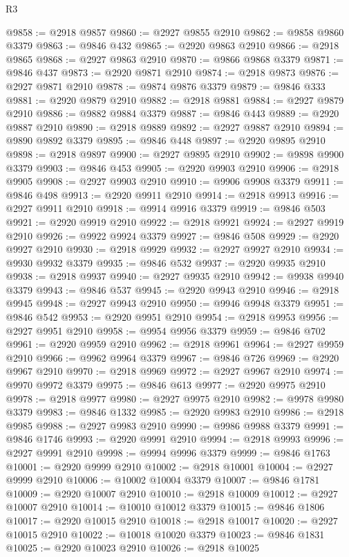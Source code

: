 \begin{lexlean}{R3}
\begin{coremodule}
@9858 := @2918 @9857
@9860 := @2927 @9855 @2910
@9862 := @9858 @9860 @3379
@9863 := @9846 @432
@9865 := @2920 @9863 @2910
@9866 := @2918 @9865
@9868 := @2927 @9863 @2910
@9870 := @9866 @9868 @3379
@9871 := @9846 @437
@9873 := @2920 @9871 @2910
@9874 := @2918 @9873
@9876 := @2927 @9871 @2910
@9878 := @9874 @9876 @3379
@9879 := @9846 @333
@9881 := @2920 @9879 @2910
@9882 := @2918 @9881
@9884 := @2927 @9879 @2910
@9886 := @9882 @9884 @3379
@9887 := @9846 @443
@9889 := @2920 @9887 @2910
@9890 := @2918 @9889
@9892 := @2927 @9887 @2910
@9894 := @9890 @9892 @3379
@9895 := @9846 @448
@9897 := @2920 @9895 @2910
@9898 := @2918 @9897
@9900 := @2927 @9895 @2910
@9902 := @9898 @9900 @3379
@9903 := @9846 @453
@9905 := @2920 @9903 @2910
@9906 := @2918 @9905
@9908 := @2927 @9903 @2910
@9910 := @9906 @9908 @3379
@9911 := @9846 @498
@9913 := @2920 @9911 @2910
@9914 := @2918 @9913
@9916 := @2927 @9911 @2910
@9918 := @9914 @9916 @3379
@9919 := @9846 @503
@9921 := @2920 @9919 @2910
@9922 := @2918 @9921
@9924 := @2927 @9919 @2910
@9926 := @9922 @9924 @3379
@9927 := @9846 @508
@9929 := @2920 @9927 @2910
@9930 := @2918 @9929
@9932 := @2927 @9927 @2910
@9934 := @9930 @9932 @3379
@9935 := @9846 @532
@9937 := @2920 @9935 @2910
@9938 := @2918 @9937
@9940 := @2927 @9935 @2910
@9942 := @9938 @9940 @3379
@9943 := @9846 @537
@9945 := @2920 @9943 @2910
@9946 := @2918 @9945
@9948 := @2927 @9943 @2910
@9950 := @9946 @9948 @3379
@9951 := @9846 @542
@9953 := @2920 @9951 @2910
@9954 := @2918 @9953
@9956 := @2927 @9951 @2910
@9958 := @9954 @9956 @3379
@9959 := @9846 @702
@9961 := @2920 @9959 @2910
@9962 := @2918 @9961
@9964 := @2927 @9959 @2910
@9966 := @9962 @9964 @3379
@9967 := @9846 @726
@9969 := @2920 @9967 @2910
@9970 := @2918 @9969
@9972 := @2927 @9967 @2910
@9974 := @9970 @9972 @3379
@9975 := @9846 @613
@9977 := @2920 @9975 @2910
@9978 := @2918 @9977
@9980 := @2927 @9975 @2910
@9982 := @9978 @9980 @3379
@9983 := @9846 @1332
@9985 := @2920 @9983 @2910
@9986 := @2918 @9985
@9988 := @2927 @9983 @2910
@9990 := @9986 @9988 @3379
@9991 := @9846 @1746
@9993 := @2920 @9991 @2910
@9994 := @2918 @9993
@9996 := @2927 @9991 @2910
@9998 := @9994 @9996 @3379
@9999 := @9846 @1763
@10001 := @2920 @9999 @2910
@10002 := @2918 @10001
@10004 := @2927 @9999 @2910
@10006 := @10002 @10004 @3379
@10007 := @9846 @1781
@10009 := @2920 @10007 @2910
@10010 := @2918 @10009
@10012 := @2927 @10007 @2910
@10014 := @10010 @10012 @3379
@10015 := @9846 @1806
@10017 := @2920 @10015 @2910
@10018 := @2918 @10017
@10020 := @2927 @10015 @2910
@10022 := @10018 @10020 @3379
@10023 := @9846 @1831
@10025 := @2920 @10023 @2910
@10026 := @2918 @10025

\end{coremodule}
\end{lexlean}
